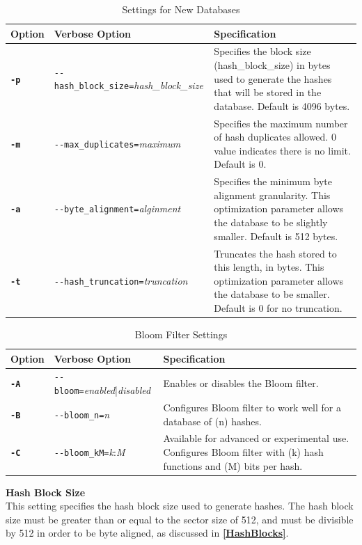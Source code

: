 \documentclass[11pt,fleqn]{article} %
\begin{document}
\begin{table}[!ht]
\centering
\caption{Settings for New Databases}
\label{tab:hashDBSettings}
\begin{tabular}{|p{1.5 cm}|p{8 cm}|p{4 cm}|}
\hline \hline
\textbf{Option} & \textbf{Verbose Option} & \textbf{Specification} \\
\hline
\textbf{\texttt{-p}} & \verb+--hash_block_size=+\textit{hash\_block\_size} & Specifies the block size (hash\_block\_size) in bytes used to generate the hashes that will be stored in the database. Default is 4096 bytes.  \\
\hline
\textbf{\texttt{-m}} & \verb+--max_duplicates=+\textit{maximum} & Specifies the maximum number of hash duplicates allowed. 0 value indicates there is no limit. Default is 0.\\
\hline
\textbf{\texttt{-a}} & \verb+--byte_alignment=+\textit{alginment} & Specifies the minimum byte alignment granularity.  This optimization parameter allows the database to be slightly smaller.  Default is 512 bytes.\\
\hline
\textbf{\texttt{-t}} & \verb+--hash_truncation=+\textit{truncation} & Truncates the hash stored to this length, in bytes.  This optimization parameter allows the database to be smaller.  Default is 0 for no truncation.\\
\hline
\end{tabular}
\end{table}

\begin{table}[!ht]
\centering
\caption{Bloom Filter Settings}
\label{tab:bloomSettings}
\begin{tabular}{|p{1.5 cm}|p{8 cm}|p{4 cm}|}
\hline \hline
\textbf{Option} & \textbf{Verbose Option} & \textbf{Specification} \\
\hline
\textbf{\texttt{-A}} & \verb+--bloom=+\textit{enabled}|\textit{disabled} & Enables or disables the Bloom filter.\\
\hline
\textbf{\texttt{-B}} & \verb+--bloom_n=+\textit{n} & Configures Bloom filter to work well for a database of (n) hashes.\\
\hline
\textbf{\texttt{-C}} & \verb+--bloom_kM=+\textit{k}:\textit{M} & Available for advanced or experimental use.  Configures Bloom filter with (k) hash functions and (M) bits per hash.\\
\hline
\end{tabular}
\end{table}

\textbf{Hash Block Size}\\
This setting specifies the hash block size used to generate hashes.
The hash block size must be greater than or equal to the sector size of 512,
and must be divisible by 512 in order to be byte aligned, as discussed
in \textbf{\autoref{HashBlocks}}.\\
\end{document}

